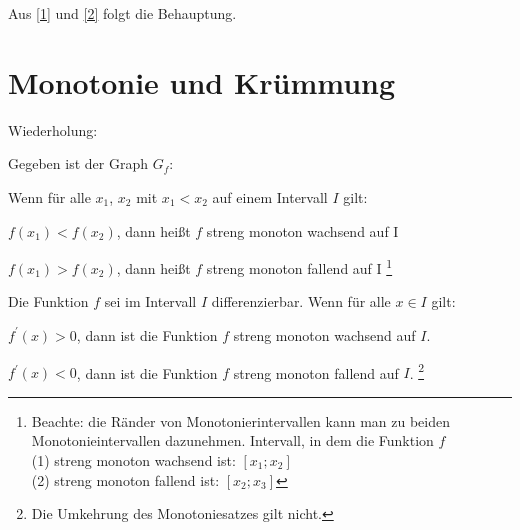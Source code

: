 Aus \eqref{1} und \eqref{2} folgt die Behauptung.

\section{Monotonie und Krümmung}
Wiederholung:

Gegeben ist der Graph $G_f$:

\begin{definition}
    Wenn für alle $x_1$, $x_2$ mit $x_1 < x_2$ auf einem Intervall $I$ gilt:
    
    $f(x_1) < f(x_2)$, dann heißt $f$ streng monoton wachsend auf I

    $f(x_1) > f(x_2)$, dann heißt $f$ streng monoton fallend auf I \footnote{Beachte: die Ränder von Monotonierintervallen kann man zu beiden Monotonieintervallen dazunehmen. Intervall, in dem die Funktion $f$ \\ (1) streng monoton wachsend ist: $[x_1;x_2]$ \\(2) streng monoton fallend ist: $[x_2;x_3]$} \\
\end{definition}
\begin{satz}[Monotoniesatz]
    Die Funktion $f$ sei im Intervall $I$ differenzierbar. Wenn für alle $x \in I$ gilt:

    $f^\prime(x) > 0$, dann ist die Funktion $f$ streng monoton wachsend auf $I$. 
    
    $f^\prime(x) < 0$, dann ist die Funktion $f$ streng monoton fallend auf $I$. \footnote{Die Umkehrung des Monotoniesatzes gilt nicht.} \\
\end{satz}

